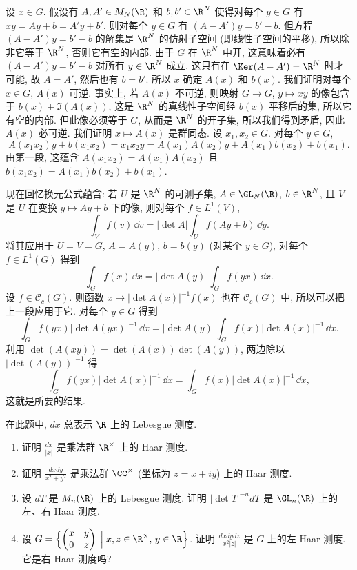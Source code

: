 \begin{solution}
设 $x \in G$. 假设有 $A, A' \in M_N(\R)$ 和 $b, b' \in \R^N$ 使得对每个 $y \in G$ 有 $xy = Ay + b = A'y + b'$. 则对每个 $y \in G$ 有 $(A - A')y = b' - b$. 但方程 $(A - A')y = b' - b$ 的解集是 $\R^N$ 的仿射子空间 (即线性子空间的平移), 所以除非它等于 $\R^N$, 否则它有空的内部. 由于 $G$ 在 $\R^N$ 中开, 这意味着必有 $(A - A')y = b' - b$ 对所有 $y \in \R^N$ 成立. 这只有在 $\Ker(A - A') = \R^N$ 时才可能, 故 $A = A'$, 然后也有 $b = b'$. 所以 $x$ 确定 $A(x)$ 和 $b(x)$.
我们证明对每个 $x \in G$, $A(x)$ 可逆. 事实上, 若 $A(x)$ 不可逆, 则映射 $G \to G$, $y \longmapsto xy$ 的像包含于 $b(x) + \Im(A(x))$, 这是 $\R^N$ 的真线性子空间经 $b(x)$ 平移后的集, 所以它有空的内部. 但此像必须等于 $G$, 从而是 $\R^N$ 的开子集, 所以我们得到矛盾, 因此 $A(x)$ 必可逆.
我们证明 $x \longmapsto A(x)$ 是群同态. 设 $x_1, x_2 \in G$. 对每个 $y \in G$,
\[
A(x_1x_2)y + b(x_1x_2) = x_1x_2y = A(x_1)A(x_2)y + A(x_1)b(x_2) + b(x_1).
\]
由第一段, 这蕴含 $A(x_1x_2) = A(x_1)A(x_2)$ 且 $b(x_1x_2) = A(x_1)b(x_2) + b(x_1)$.

现在回忆换元公式蕴含: 若 $U$ 是 $\R^N$ 的可测子集, $A \in \GL_N(\R)$, $b \in \R^N$, 且 $V$ 是 $U$ 在变换 $y \longmapsto Ay + b$ 下的像, 则对每个 $f \in L^1(V)$,
\[
\int_V f(v)\,\dd v = |\det A|\int_U f(Ay + b)\,\dd y.
\]
将其应用于 $U = V = G$, $A = A(y)$, $b = b(y)$ (对某个 $y \in G$), 对每个 $f \in L^1(G)$ 得到
\[
\int_G f(x)\,\dd x = |\det A(y)|\int_G f(yx)\,\dd x.
\]
设 $f \in \mathcal{C}_c(G)$. 则函数 $x \longmapsto |\det A(x)|^{-1}f(x)$ 也在 $\mathcal{C}_c(G)$ 中, 所以可以把上一段应用于它. 对每个 $y \in G$ 得到
\[
\int_G f(yx)|\det A(yx)|^{-1}\,\dd x = |\det A(y)|\int_G f(x)|\det A(x)|^{-1}\,\dd x.
\]
利用 $\det(A(xy)) = \det(A(x))\det(A(y))$, 两边除以 $|\det(A(y))|^{-1}$ 得
\[
\int_G f(yx)|\det A(x)|^{-1}\,\dd x = \int_G f(x)|\det A(x)|^{-1}\,\dd x,
\]
这就是所要的结果.
\end{solution}

\begin{exercise}
\label{ex:I.5.3.2}
在此题中, $dx$ 总表示 $\R$ 上的 Lebesgue 测度.
\begin{enumerate}
\item[(a)] 证明 $\frac{dx}{|x|}$ 是乘法群 $\R^{\times}$ 上的 Haar 测度.
\item[(b)] 证明 $\frac{dxdy}{x^2 + y^2}$ 是乘法群 $\CC^{\times}$ (坐标为 $z = x + iy$) 上的 Haar 测度.
\item[(c)] 设 $dT$ 是 $M_n(\R)$ 上的 Lebesgue 测度. 证明 $|\det T|^{-n}dT$ 是 $\GL_n(\R)$ 上的左、右 Haar 测度.
\item[(d)] 设 $G = \Bigl\{\begin{pmatrix} x & y \\ 0 & z \end{pmatrix} \;\Big|\; x, z \in \R^{\times},\, y \in \R\Bigr\}$. 证明 $\frac{dxdydz}{x^2|z|}$ 是 $G$ 上的左 Haar 测度. 它是右 Haar 测度吗?
\end{enumerate}
\end{exercise}

